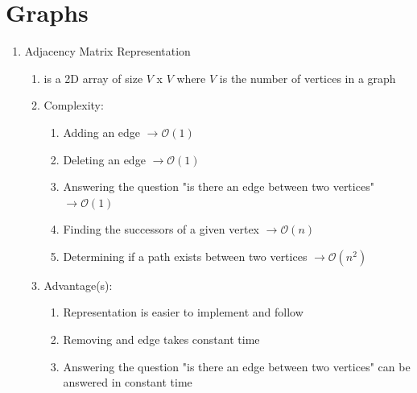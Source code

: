 \documentclass [12pt, executivepaper]{article}
\begin{document}
\pagebreak

\vspace*{-40mm}

\section*{Graphs}

\begin{enumerate}

\item Adjacency Matrix Representation

\begin{enumerate}

\item is a 2D array of size $V$ x $V$ where $V$ is the number of vertices in a graph

\item Complexity:

\begin{enumerate}

\item Adding an edge $\rightarrow \mathcal{O}(1)$

\item Deleting an edge $\rightarrow \mathcal{O}(1)$

\item Answering the question "is there an edge between two vertices" $\rightarrow \mathcal{O}(1)$

\item Finding the successors of a given vertex $\rightarrow \mathcal{O}(n)$

\item Determining if a path exists between two vertices $\rightarrow \mathcal{O}(n^2)$

\end{enumerate}

\item Advantage(s):

\begin{enumerate}

\item Representation is easier to implement and follow

\item Removing and edge takes constant time

\item Answering the question "is there an edge between two vertices" can be answered in constant time


\end{enumerate}
\end{enumerate}
\end{enumerate}
\end{document}
